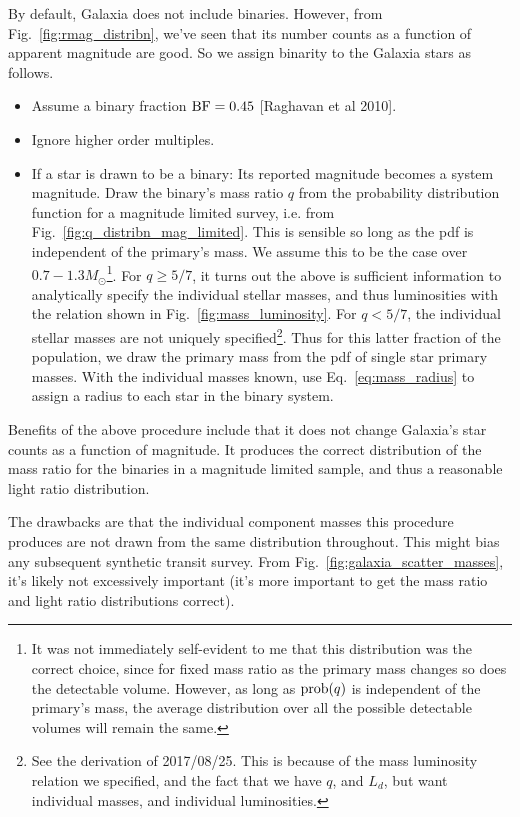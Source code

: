 \documentclass{emulateapj}
\begin{document}
By default, Galaxia does not include binaries.
However, from Fig.~\ref{fig:rmag_distribn}, we've seen that its number counts 
as a function of apparent magnitude are good.
So we assign binarity to the Galaxia stars as follows.
\begin{itemize}
	\item Assume a binary fraction ${\rm BF} = 0.45$ [Raghavan et al 2010].
	\item Ignore higher order multiples.
	\item If a star is drawn to be a binary:
	\subitem Its reported magnitude becomes a system magnitude.
	\subitem Draw the binary's mass ratio $q$ from the probability distribution 
	function for a magnitude limited survey, i.e. from 
	Fig.~\ref{fig:q_distribn_mag_limited}. This is sensible so long as the pdf 
	is independent of the primary's mass. We assume this to be the case over 
	$0.7-1.3M_\odot$\footnote{It was not immediately self-evident to me that 
	this distribution was the correct choice, since for fixed mass ratio as the 
	primary mass changes so does the detectable volume. However, as long as 
	${\rm prob}(q)$ is independent of the primary's mass, the average 
	distribution over all the possible detectable volumes will remain the 
	same.}.
	\subitem For $q \geq 5/7$, it turns out the above is sufficient information 
	to analytically specify the individual stellar masses, and thus 
	luminosities with the relation shown in Fig.~\ref{fig:mass_luminosity}.
	\subitem For $q < 5/7$, the individual stellar masses are not uniquely 
	specified\footnote{See the derivation of 2017/08/25. This is because of the 
	mass luminosity relation we specified, and the fact that we have $q$, and 
	$L_d$, but want individual masses, and individual luminosities.}. Thus for 
	this latter fraction of the population, we draw the 
	primary mass from the pdf of single star primary masses.
	\subitem With the individual masses known, use Eq.~\ref{eq:mass_radius} to 
	assign a radius to each star in the binary system.
\end{itemize}

Benefits of the above procedure include that it does not change Galaxia's 
star counts as a function of magnitude.
It produces the correct distribution of the mass ratio for the binaries in a 
magnitude limited sample, and thus a reasonable light ratio distribution. 

The drawbacks are that the individual component masses this procedure produces 
are not drawn from the same distribution throughout.
This might bias any subsequent synthetic transit survey.
From Fig.~\ref{fig:galaxia_scatter_masses}, it's likely not excessively 
important (it's more important to get the mass ratio and light ratio 
distributions correct).
\end{document}

